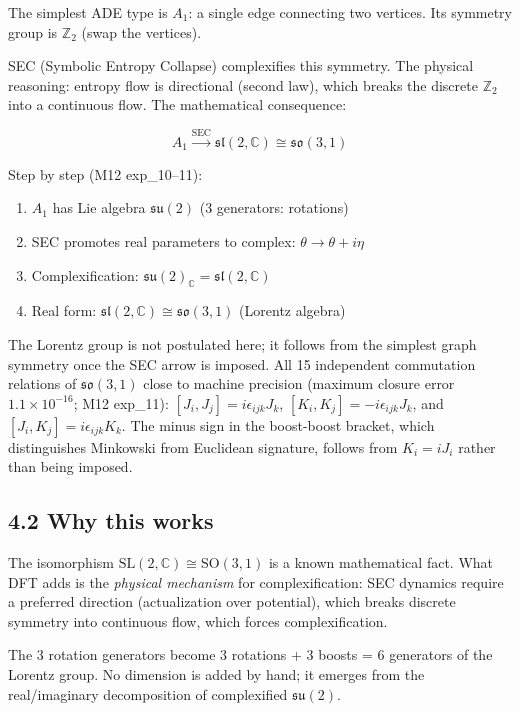 \documentclass[11pt,a4paper]{article}
\providecommand{\tightlist}{\setlength{\itemsep}{0pt}\setlength{\parskip}{0pt}}
\begin{document}
The simplest ADE type is $A_1$: a single edge connecting two vertices. Its symmetry group is $\mathbb{Z}_2$ (swap the vertices).

SEC (Symbolic Entropy Collapse) complexifies this symmetry. The physical reasoning: entropy flow is directional (second law), which breaks the discrete $\mathbb{Z}_2$ into a continuous flow. The mathematical consequence:

\[A_1 \xrightarrow{\text{SEC}} \mathfrak{sl}(2, \mathbb{C}) \cong \mathfrak{so}(3,1)\]

Step by step (M12 exp\_10–11):
\begin{enumerate}\tightlist
\item $A_1$ has Lie algebra $\mathfrak{su}(2)$ (3 generators: rotations)
\item SEC promotes real parameters to complex: $\theta \to \theta + i\eta$
\item Complexification: $\mathfrak{su}(2)_{\mathbb{C}} = \mathfrak{sl}(2, \mathbb{C})$
\item Real form: $\mathfrak{sl}(2, \mathbb{C}) \cong \mathfrak{so}(3,1)$ (Lorentz algebra)
\end{enumerate}

The Lorentz group is not postulated here; it follows from the simplest graph symmetry once the SEC arrow is imposed. All 15 independent commutation relations of $\mathfrak{so}(3,1)$ close to machine precision (maximum closure error $1.1\times10^{-16}$; M12 exp\_11): $[J_i,J_j]=i\epsilon_{ijk}J_k$, $[K_i,K_j]=-i\epsilon_{ijk}J_k$, and $[J_i,K_j]=i\epsilon_{ijk}K_k$. The minus sign in the boost-boost bracket, which distinguishes Minkowski from Euclidean signature, follows from $K_i=iJ_i$ rather than being imposed.

\subsection*{4.2 Why this works}

The isomorphism $\text{SL}(2, \mathbb{C}) \cong \text{SO}(3,1)$ is a known mathematical fact. What DFT adds is the \emph{physical mechanism} for complexification: SEC dynamics require a preferred direction (actualization over potential), which breaks discrete symmetry into continuous flow, which forces complexification.

The 3 rotation generators become 3 rotations + 3 boosts = 6 generators of the Lorentz group. No dimension is added by hand; it emerges from the real/imaginary decomposition of complexified $\mathfrak{su}(2)$.
\end{document}
